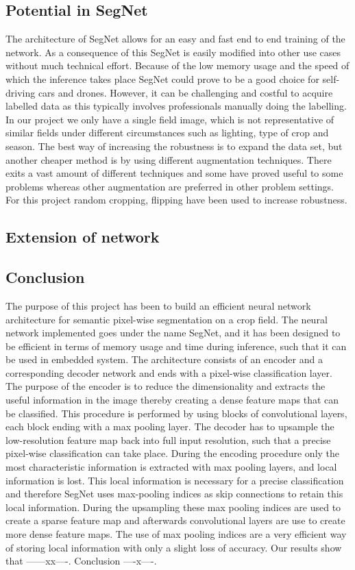 \documentclass{article}
\begin{document}
\subsection{Potential in SegNet}
The architecture of SegNet allows for an easy and fast end to end training of the network. As a consequence of this SegNet is easily modified into other use cases without much technical effort. Because of the low memory usage and the speed of which the inference takes place SegNet could prove to be a good choice for self-driving cars and drones. However, it can be challenging and costful to acquire labelled data as this typically involves professionals manually doing the labelling. In our project we only have a single field image, which is not representative of similar fields under different circumstances such as lighting, type of crop and season. The best way of increasing the robustness is to expand the data set, but another cheaper method is by using different augmentation techniques. There exits a vast amount of different techniques and some have proved useful to some problems whereas other augmentation are preferred in other problem settings. For this project random cropping, flipping have been used to increase robustness.

\subsection{Extension of network}


\subsection{Conclusion}
The purpose of this project has been to build an efficient neural network architecture for semantic pixel-wise segmentation on a crop field. The neural network implemented goes under the name SegNet, and it has been designed to be efficient in terms of memory usage and time during inference, such that it can be used in embedded system. The architecture consists of an encoder and a corresponding decoder network and ends with a pixel-wise classification layer. The purpose of the encoder is to reduce the dimensionality and extracts the useful information in the image thereby creating a dense feature maps that can be classified. This procedure is performed by using blocks of convolutional layers, each block ending with a max pooling layer. The decoder has to upsample the low-resolution feature map back into full input resolution, such that a precise pixel-wise classification can take place. During the encoding procedure only the most characteristic information is extracted with max pooling layers, and local information is lost. This local information is necessary for a precise classification and therefore SegNet uses max-pooling indices as skip connections to retain this local information. During the upsampling these max pooling indices are used to create a sparse feature map and afterwards convolutional layers are use to create more dense feature maps. The use of max pooling indices are a very efficient way of storing local information with only a slight loss of accuracy. Our results show that ------xx----. Conclusion ----x----.
\end{document}
